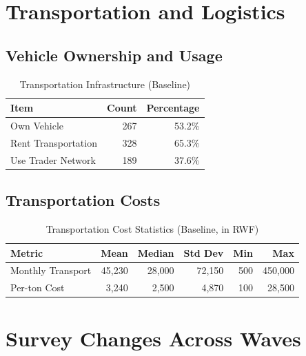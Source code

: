 \documentclass[11pt]{article}
\begin{document}
\section{Transportation and Logistics}

\subsection{Vehicle Ownership and Usage}

\begin{table}[h!]
\centering
\caption{Transportation Infrastructure (Baseline)}
\label{tab:transport}
\begin{tabularx}{0.9\textwidth}{lrr}
\toprule
\textbf{Item} & \textbf{Count} & \textbf{Percentage} \\
\midrule
Own Vehicle & 267 & 53.2\% \\
Rent Transportation & 328 & 65.3\% \\
Use Trader Network & 189 & 37.6\% \\
\bottomrule
\end{tabularx}
\end{table}

\subsection{Transportation Costs}

\begin{table}[h!]
\centering
\caption{Transportation Cost Statistics (Baseline, in RWF)}
\label{tab:transport_cost}
\begin{tabularx}{0.9\textwidth}{lrrrrr}
\toprule
\textbf{Metric} & \textbf{Mean} & \textbf{Median} & \textbf{Std Dev} & \textbf{Min} & \textbf{Max} \\
\midrule
Monthly Transport & 45,230 & 28,000 & 72,150 & 500 & 450,000 \\
Per-ton Cost & 3,240 & 2,500 & 4,870 & 100 & 28,500 \\
\bottomrule
\end{tabularx}
\end{table}

\section{Survey Changes Across Waves}
\end{document}
